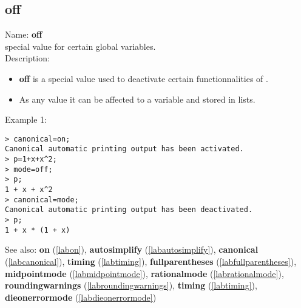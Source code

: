 \subsection{off}
\label{laboff}
\noindent Name: \textbf{off}\\
special value for certain global variables.\\
\noindent Description: \begin{itemize}

\item \textbf{off} is a special value used to deactivate certain functionnalities
   of \sollya.

\item As any value it can be affected to a variable and stored in lists.
\end{itemize}
\noindent Example 1: 
\begin{center}\begin{minipage}{15cm}\begin{Verbatim}[frame=single]
> canonical=on;
Canonical automatic printing output has been activated.
> p=1+x+x^2;
> mode=off;
> p;
1 + x + x^2
> canonical=mode;
Canonical automatic printing output has been deactivated.
> p;
1 + x * (1 + x)
\end{Verbatim}
\end{minipage}\end{center}
See also: \textbf{on} (\ref{labon}), \textbf{autosimplify} (\ref{labautosimplify}), \textbf{canonical} (\ref{labcanonical}), \textbf{timing} (\ref{labtiming}), \textbf{fullparentheses} (\ref{labfullparentheses}), \textbf{midpointmode} (\ref{labmidpointmode}), \textbf{rationalmode} (\ref{labrationalmode}), \textbf{roundingwarnings} (\ref{labroundingwarnings}), \textbf{timing} (\ref{labtiming}), \textbf{dieonerrormode} (\ref{labdieonerrormode})
